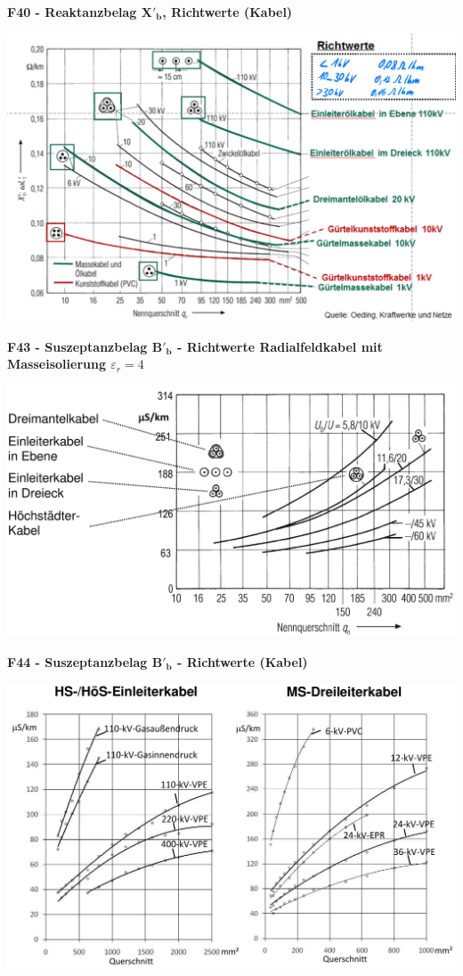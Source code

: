 \textbf{F40 - Reaktanzbelag $\mathbf{X'_b}$, Richtwerte (Kabel)}

\includegraphics[width=0.7\columnwidth]{figures/f39_reaktanzbelag_kabel.png}

\textbf{F43 - Suszeptanzbelag $\mathbf{B'_b}$ - Richtwerte Radialfeldkabel mit Masseisolierung $\varepsilon_r = 4$}

\includegraphics[width=0.7\columnwidth]{figures/f43_kabel_radialfeldkabel_masseiso.png}

\textbf{F44 - Suszeptanzbelag $\mathbf{B'_b}$ - Richtwerte (Kabel)}

\includegraphics[width=0.6\columnwidth]{figures/f44_suszeptanzbelag_weitere_kabeltypen.png}
